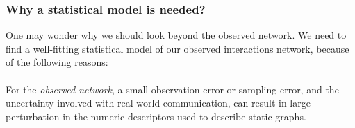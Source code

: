 \documentclass[11pt]{report}
\begin{document}
\subsubsection{Why a statistical model is needed?}

One may wonder why we should look beyond the observed network. We need to find a well-fitting statistical model of our observed interactions network, because of the following reasons: 

\paragraph{} For the \textit{observed network}, a small observation error or sampling error, and the uncertainty involved with real-world communication, can result in large perturbation in the numeric descriptors used to describe static graphs. 
\end{document}

